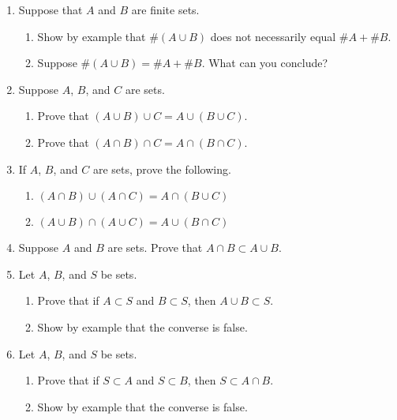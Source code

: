 \begin{enumerate}
    \item Suppose that $A$ and $B$ are finite sets.
  \begin{enumerate}
      \item Show by example that $\# (A \cup B)$ does not necessarily equal $\# A + \# B$. 
      \item Suppose $\# (A \cup B) = \# A + \# B$. What can you conclude?
  \end{enumerate}

    \item Suppose $A$, $B$, and $C$ are sets.
  \begin{enumerate}
      \item Prove that $(A \cup B) \cup C = A \cup (B \cup C)$.
      \item Prove that $(A \cap B) \cap C = A \cap (B \cap C)$.
  \end{enumerate}

    \item If $A$, $B$, and $C$ are sets, prove the following.
  \begin{enumerate}
      \item $(A \cap B) \cup (A \cap C) = A \cap (B \cup C)$
      \item $(A \cup B) \cap (A \cup C) = A \cup (B \cap C)$
  \end{enumerate}

    \item Suppose $A$ and $B$ are sets. Prove that $A \cap B \subset A \cup B$.

    \item Let $A$, $B$, and $S$ be sets.
  \begin{enumerate}
      \item Prove that if $A \subset S$ and $B \subset S$, then $A \cup B \subset S$.
      \item Show by example that the converse is false.
  \end{enumerate}


    \item Let $A$, $B$, and $S$ be sets.
  \begin{enumerate}
      \item Prove that if $S \subset A$ and $S \subset B$, then $S \subset A \cap B$.
      \item Show by example that the converse is false.
  \end{enumerate}


\end{enumerate}
